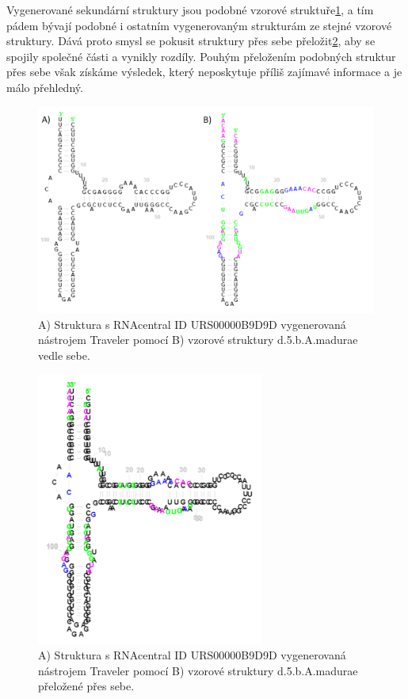 Vygenerované sekundární struktury jsou podobné vzorové struktuře\ref{blabla}, a
tím pádem bývají podobné i ostatním vygenerovaným strukturám ze stejné vzorové
struktury. Dává proto smysl se pokusit struktury přes sebe přeložit\ref{over},
aby se spojily společné části a vynikly rozdíly. Pouhým přeložením podobných
struktur přes sebe však získáme výsledek, který neposkytuje příliš zajímavé
informace a je málo přehledný.

\begin{figure}[H]
  \centering
  \includegraphics[width=140mm]{../img/kap02/align/structures.png}
  \caption[Vygenerovaná struktura vedle se vzorovou]{A) Struktura s RNAcentral
  ID URS00000B9D9D vygenerovaná nástrojem Traveler pomocí B) vzorové struktury
  d.5.b.A.madurae vedle sebe.}
  \label{blabla}
\end{figure}

\begin{figure}[H]
  \centering
  \includegraphics[height=90mm]{../img/kap02/align/unaligned.png}
  \caption[Vygenerovaná a vzorová struktura vykreslené přes sebe]{A) Struktura
  s RNAcentral ID URS00000B9D9D vygenerovaná nástrojem Traveler pomocí B)
  vzorové struktury d.5.b.A.madurae přeložené přes sebe.}
  \label{over}
\end{figure}

